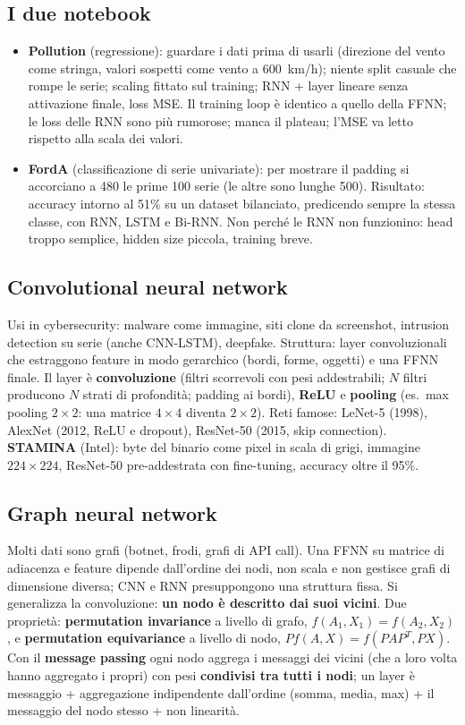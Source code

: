 \subsection{I due notebook}
\begin{itemize}
  \item \textbf{Pollution} (regressione): guardare i dati prima di usarli (direzione del vento come
    stringa, valori sospetti come vento a 600~km/h); niente split casuale che rompe le serie; scaling
    fittato sul training; RNN + layer lineare senza attivazione finale, loss MSE. Il training loop è
    identico a quello della FFNN; le loss delle RNN sono più rumorose; manca il plateau; l'MSE va letto
    rispetto alla scala dei valori.
  \item \textbf{FordA} (classificazione di serie univariate): per mostrare il padding si accorciano a
    480 le prime 100 serie (le altre sono lunghe 500). Risultato: accuracy intorno al 51\% su un dataset
    bilanciato, predicendo sempre la stessa classe, con RNN, LSTM e Bi-RNN. Non perché le RNN non
    funzionino: head troppo semplice, hidden size piccola, training breve.
\end{itemize}

\subsection{Convolutional neural network}
Usi in cybersecurity: malware come immagine, siti clone da screenshot, intrusion detection su serie
(anche CNN-LSTM), deepfake. Struttura: layer convoluzionali che estraggono feature in modo gerarchico
(bordi, forme, oggetti) e una FFNN finale. Il layer è \textbf{convoluzione} (filtri scorrevoli con
pesi addestrabili; $N$ filtri producono $N$ strati di profondità; padding ai bordi), \textbf{ReLU} e
\textbf{pooling} (es.\ max pooling $2\times2$: una matrice $4\times4$ diventa $2\times2$). Reti
famose: LeNet-5 (1998), AlexNet (2012, ReLU e dropout), ResNet-50 (2015, skip connection).
\textbf{STAMINA} (Intel): byte del binario come pixel in scala di grigi, immagine $224\times224$,
ResNet-50 pre-addestrata con fine-tuning, accuracy oltre il 95\%.

\subsection{Graph neural network}
Molti dati sono grafi (botnet, frodi, grafi di API call). Una FFNN su matrice di adiacenza e feature
dipende dall'ordine dei nodi, non scala e non gestisce grafi di dimensione diversa; CNN e RNN
presuppongono una struttura fissa. Si generalizza la convoluzione: \textbf{un nodo è descritto dai
suoi vicini}. Due proprietà: \textbf{permutation invariance} a livello di grafo,
$f(A_1,X_1)=f(A_2,X_2)$, e \textbf{permutation equivariance} a livello di nodo,
$Pf(A,X)=f(PAP^T,PX)$. Con il \textbf{message passing} ogni nodo aggrega i messaggi dei vicini
(che a loro volta hanno aggregato i propri) con pesi \textbf{condivisi tra tutti i nodi}; un layer è
messaggio + aggregazione indipendente dall'ordine (somma, media, max) + il messaggio del nodo stesso +
non linearità.

